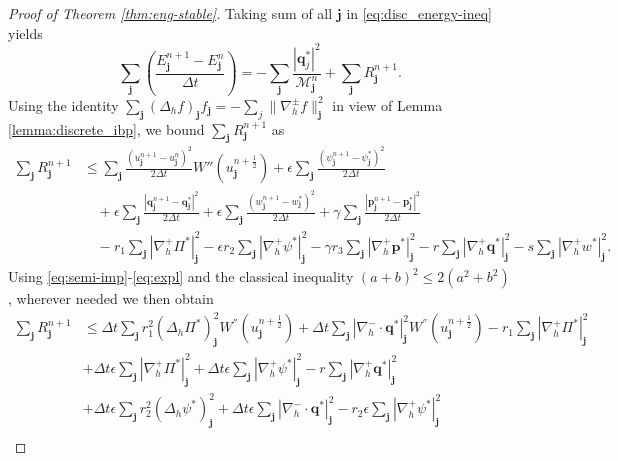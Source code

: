 \documentclass[11pt]{article}
\numberwithin{equation}{section}
\newtheorem{counter example}[theorem]{Counter Example}
\numberwithin{equation}{section}
\numberwithin{equation}{section}
\newcommand{\half}{\frac{1}{2}}
\begin{document}
\begin{proof}[Proof of Theorem  \ref{thm:eng-stable}]
Taking sum of all $\mathbf{j}$ in \eqref{eq:disc_energy-ineq} yields
\begin{equation}
\label{eq:sum_eng-id}
\sum_{\mathbf{j}}\left(\frac{E_{\mathbf{j}}^{n+1}-E_{\mathbf{j}}^{n}}{\Delta t}\right)=-\sum_{\mathbf{j}}\frac{|\mathbf{q}_{j}^{*}|^2}{\mathcal{M}_{\mathbf{j}}^n}+\sum_{\mathbf{j}}R_{\mathbf{j}}^{n+1}.
\end{equation}
Using the identity $\sum_{\mathbf{j}}(\Delta_h f)_{\mathbf{j}}f_{\mathbf{j}}=-\sum_{j}\lVert \nabla_h^\pm f\rVert^2_{\mathbf{j}}$ in view of Lemma \ref{lemma:discrete_ibp}, we bound $\sum_{\mathbf{j}}R_{\mathbf{j}}^{n+1}$ as
\[
\begin{aligned}
\sum_{\mathbf{j}}R_{\mathbf{j}}^{n+1}
&\leq
\sum_{\mathbf{j}} \frac{(u_{\mathbf{j}}^{n+1}-u_{\mathbf{j}}^n)^2}{2\Delta t}
W''(u_{\mathbf{j}}^{n+\frac12})
+\epsilon\sum_{\mathbf{j}}\frac{(\psi_{\mathbf{j}}^{n+1}-\psi^*_{\mathbf{j}})^2}{2\Delta t} \\
&\quad
+\epsilon\sum_{\mathbf{j}}\frac{|\mathbf q_{\mathbf{j}}^{n+1}-\mathbf q_{\mathbf{j}}^*|^2}{2\Delta t}
+\epsilon\sum_{\mathbf{j}}\frac{(w_{\mathbf{j}}^{n+1}-w_{\mathbf{j}}^*)^2}{2\Delta t}
+\gamma\sum_{\mathbf{j}}\frac{|\mathbf p_{\mathbf{j}}^{n+1}-\mathbf p_{\mathbf{j}}^*|^2}{2\Delta t} \\
&\quad
-r_1\sum_{\mathbf{j}}|\nabla_h^+\Pi^*|_{\mathbf{j}}^2
-\epsilon r_2\sum_{\mathbf{j}}|\nabla_h^+\psi^*|_{\mathbf{j}}^2
 -\gamma r_3\sum_{\mathbf{j}}|\nabla_h^+\mathbf p^*|_{\mathbf{j}}^2 
-r\sum_\mathbf{j}|\nabla_h^+\mathbf q^*|_{\mathbf{j}}^2
-s\sum_{\mathbf{j}}|\nabla_h^+w^*|_{\mathbf{j}}^2 .
\end{aligned}
\]
Using \eqref{eq:semi-imp}-\eqref{eq:expl} and the classical inequality $(a+b)^2\leq 2(a^2+b^2)$, wherever needed we then obtain
\begin{align}\label{eq: main_remainders}
\sum_{\mathbf{j}}R_{\mathbf{j}}^{n+1}&\leq \Delta t \sum_{\mathbf{j}} r_1^2(\Delta_h \Pi^*)_{\mathbf{j}}^2W^{''}(u_{\mathbf{j}}^{n+\half})+\Delta t\sum_{\mathbf{j}}|\nabla_h^{-} \cdot \mathbf{q}^*|_{\mathbf{j}}^2W^{''}(u_{\mathbf{j}}^{n+\half})-r_1\sum_{\mathbf{j}}|\nabla_h^+ \Pi^*|^2_{\mathbf{j}}\nonumber\\
&+\Delta t \epsilon\sum_{\mathbf{j}}|\nabla_h^+ \Pi^*|_{\mathbf{j}}^2+\Delta t \epsilon\sum_{\mathbf{j}}|\nabla_h^+ \psi^*|_{\mathbf{j}}^2 -r\sum_{\mathbf{j}}|\nabla_h^{+}\mathbf{q}^*|_{\mathbf{j}}^2\nonumber\\
&+\Delta t\epsilon\sum_{\mathbf{j}}r_2^2(\Delta_h \psi^*)_\mathbf{j}^2+\Delta t \epsilon\sum_{\mathbf{j}}|\nabla_h^{-} \cdot \mathbf{q}^*|_{\mathbf{j}}^2-r_2\epsilon\sum_{\mathbf{j}}|\nabla_h^+ \psi^*|_{\mathbf{j}}^2\nonumber\\

\end{align}
\end{proof}
\end{document}

